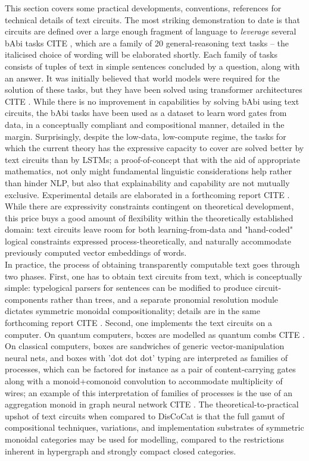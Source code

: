 This section covers some practical developments, conventions, references for technical details of text circuits. The most striking demonstration to date is that circuits are defined over a large enough fragment of language to \emph{leverage} several bAbi tasks \bR CITE \e, which are a family of 20 general-reasoning text tasks -- the italicised choice of wording will be elaborated shortly. Each family of tasks consists of tuples of text in simple sentences concluded by a question, along with an answer. It was initially believed that world models were required for the solution of these tasks, but they have been solved using transformer architectures \bR CITE \e. While there is no improvement in capabilities by solving bAbi using text circuits, the bAbi tasks have been used as a dataset to learn word gates from data, in a conceptually compliant and compositional manner, detailed in the margin. Surprisingly, despite the low-data, low-compute regime, the tasks for which the current theory has the expressive capacity to cover are solved better by text circuits than by LSTMs; a proof-of-concept that with the aid of appropriate mathematics, not only might fundamental linguistic considerations help rather than hinder NLP, but also that explainability and capability are not mutually exclusive. Experimental details are elaborated in a forthcoming report \bR CITE \e. While there are expressivity constraints contingent on theoretical development, this price buys a good amount of flexibility within the theoretically established domain: text circuits leave room for both learning-from-data and "hand-coded" logical constraints expressed process-theoretically, and naturally accommodate previously computed vector embeddings of words.\\

In practice, the process of obtaining transparently computable text goes through two phases. First, one has to obtain text circuits from text, which is conceptually simple: typelogical parsers for sentences can be modified to produce circuit-components rather than trees, and a separate pronomial resolution module dictates symmetric monoidal compositionality; details are in the same forthcoming report \bR CITE \e. Second, one implements the text circuits on a computer. On quantum computers, boxes are modelled as quantum combs \bR CITE \e. On classical computers, boxes are sandwiches of generic vector-manipulation neural nets, and boxes with 'dot dot dot' typing are interpreted as families of processes, which can be factored for instance as a pair of content-carrying gates along with a monoid+comonoid convolution to accommodate multiplicity of wires; an example of this interpretation of families of processes is the use of an aggregation monoid in graph neural network \bR CITE \e. The theoretical-to-practical upshot of text circuits when compared to DisCoCat is that the full gamut of compositional techniques, variations, and implementation substrates of symmetric monoidal categories may be used for modelling, compared to the restrictions inherent in hypergraph and strongly compact closed categories.\\

